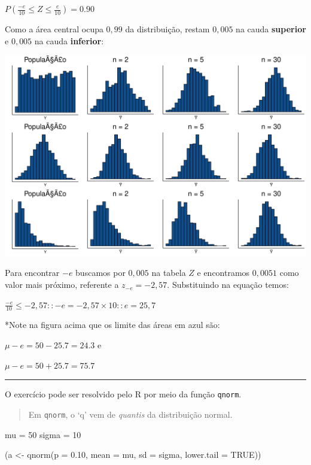 \documentclass[
]{book}
\newenvironment{Shaded}{\begin{snugshade}}{\end{snugshade}}
\newcommand{\AttributeTok}[1]{\textcolor[rgb]{0.77,0.63,0.00}{#1}}
\newcommand{\ConstantTok}[1]{\textcolor[rgb]{0.00,0.00,0.00}{#1}}
\newcommand{\DecValTok}[1]{\textcolor[rgb]{0.00,0.00,0.81}{#1}}
\newcommand{\FloatTok}[1]{\textcolor[rgb]{0.00,0.00,0.81}{#1}}
\newcommand{\FunctionTok}[1]{\textcolor[rgb]{0.00,0.00,0.00}{#1}}
\newcommand{\NormalTok}[1]{#1}
\newcommand{\OtherTok}[1]{\textcolor[rgb]{0.56,0.35,0.01}{#1}}
\begin{document}
\(P(\frac{-e}{10} \le Z \le \frac{e}{10}) = 0.90\)

Como a área central ocupa \(0,99\) da distribuição, restam \(0,005\) na cauda \textbf{superior} e \(0,005\) na cauda \textbf{inferior}:

\includegraphics{probest-cambientais_files/figure-latex/unnamed-chunk-98-1.pdf}

Para encontrar \(-e\) buscamos por \(0,005\) na tabela \(Z\) e encontramos \(0,0051\) como valor mais próximo, referente a \(z_{-e} = -2,57\). Substituindo na equação temos:

\(\frac{-e}{10} \le -2,57 :: -e = -2,57 \times 10 :: e = 25,7\)

*Note na figura acima que os limite das áreas em azul são:

\(\mu - e = 50 - 25.7 = 24.3\) e

\(\mu - e = 50 + 25.7 = 75.7\)

\begin{center}\rule{0.5\linewidth}{0.5pt}\end{center}

O exercício pode ser resolvido pelo R por meio da função \texttt{qnorm}.

\begin{quote}
Em \texttt{qnorm}, o `q' vem de \emph{quantis} da distribuição normal.
\end{quote}

\begin{Shaded}
\begin{Highlighting}[]
\NormalTok{mu }\OtherTok{=} \DecValTok{50}
\NormalTok{sigma }\OtherTok{=} \DecValTok{10}

\NormalTok{(a }\OtherTok{\textless{}{-}} \FunctionTok{qnorm}\NormalTok{(}\AttributeTok{p =} \FloatTok{0.10}\NormalTok{, }\AttributeTok{mean =}\NormalTok{ mu, }\AttributeTok{sd =}\NormalTok{ sigma, }\AttributeTok{lower.tail =} \ConstantTok{TRUE}\NormalTok{))}
\end{Highlighting}
\end{Shaded}
\end{document}
